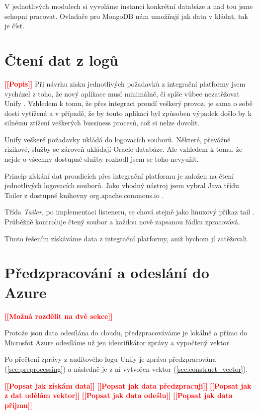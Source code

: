 \documentclass[thesis=M,czech]{FITthesis}[2012/10/20]
\newcommand{\todo}[1]{\textcolor{red}{\textbf{[[#1]]}}}
\newcommand{\blind}[1][1]{\textcolor{gray}{\Blindtext[#1][1]}}
\begin{document}
		V jednotlivých modulech si vyvoláme instanci konkrétní databáze a nad tou jsme schopni pracovat. Ovladače pro MongoDB nám umožňují jak data v kládat, tak je číst.
		
		
		
		
	\section{Čtení dat z logů}
		\todo{Popis}				
		Při návrhu zisku jednotlivých požadavků z integrační platformy jsem vycházel z toho, že nový aplikace musí minimálně, či spíše vůbec nezatěžovat Unify \cite{unify}. Vzhledem k tomu, že přes integraci proudí veškerý provoz, je sama o sobě dosti vytížená a v případě, že by touto aplikací byl způsoben výpadek došlo by k silnému ztížení veškerých bussiness procesů, což si nelze dovolit.
		
		Unify veškeré požadavky ukládá do logovacích souborů. Některé, převážně rizikové, služby se zároveň ukládají Oracle databáze. Ale vzhledem k tomu, že nejde o všechny dostupné služby rozhodl jsem se toho nevyužít.
		
		Princip získání dat proudicích přes integrační platformu je založen na čtení jednotlivých logovacích souborů. Jako vhodný nástroj jsem vybral Java třídu Tailer z dostupné knihovny org.apache.commons.io \cite{tailerClass}.
		
		Třída \textit{Tailer}, po implementaci listeneru, se chová stejně jako linuxový příkaz tail \cite{tailLinux}. Průběžně kontroluje čtený soubor a každou nově zapsanou řádku zpracovává.
		
		Tímto řešením získáváme data z integrační platformy, aniž bychom jí zatěžovali. 
		
	\section{Předzpracování a odeslání do Azure}
		\label{sec:send_to_azure}
		\todo{Možná rozdělit na dvě sekce}
		
		Protože jsou data odesílána do cloudu, předzpracováváme je lokálně a přímo do Microsfot Azure odesíláme už jen identifikátor zprávy a vypočtený vektor.
		
		Po přečtení zprávy z auditového logu Unify je zpráva předzpracována (\ref{sec:preprocessing}) a následně je z ní vytvořen vektor (\ref{sec:construct_vector}).
		
		\todo{Popsat jak získám data}
		\blind[1]
		\todo{Popsat jak data předzpracuji}
		\blind[1]
		\todo{Popsat jak z dat udělám vektor}
		\blind[1]
		\todo{Popsat jak data odešlu}
		\blind[1]
		\todo{Popsat jak data přijmu}
		\blind[1]			
		
\end{document}
